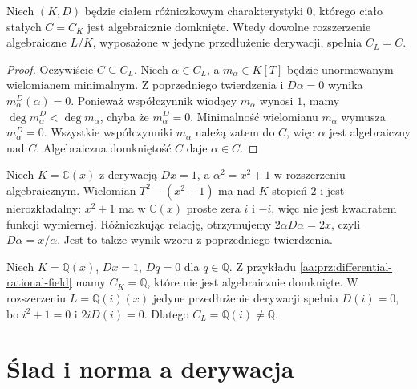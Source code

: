 \begin{wniosek}
\label{aa:cor:algebraic-constants}
Niech $(K,D)$ będzie ciałem różniczkowym
charakterystyki $0$, którego ciało stałych $C=C_K$
jest algebraicznie domknięte. Wtedy dowolne
rozszerzenie algebraiczne $L/K$, wyposażone
w jedyne przedłużenie derywacji, spełnia $C_L=C$.
\end{wniosek}
\begin{proof}
Oczywiście $C\subseteq C_L$. Niech $\alpha\in C_L$,
a $m_\alpha\in K[T]$ będzie unormowanym
wielomianem minimalnym. Z poprzedniego twierdzenia
i $D\alpha=0$ wynika $m_\alpha^D(\alpha)=0$.
Ponieważ współczynnik wiodący $m_\alpha$ wynosi $1$,
mamy $\deg m_\alpha^D<\deg m_\alpha$,
chyba że $m_\alpha^D=0$. Minimalność wielomianu
$m_\alpha$ wymusza $m_\alpha^D=0$.
Wszystkie współczynniki $m_\alpha$ należą zatem do $C$,
więc $\alpha$ jest algebraiczny nad $C$.
Algebraiczna domkniętość $C$ daje $\alpha\in C$.
\end{proof}

\begin{przyklad}
\label{aa:prz:derivative-algebraic-sqrt}
Niech $K=\mathbb C(x)$ z derywacją $Dx=1$, a
$\alpha^2=x^2+1$ w rozszerzeniu algebraicznym.
Wielomian $T^2-(x^2+1)$ ma nad $K$ stopień $2$
i jest nierozkładalny: $x^2+1$ ma w $\mathbb C(x)$
proste zera $i$ i $-i$, więc nie jest kwadratem
funkcji wymiernej. Różniczkując relację, otrzymujemy
$2\alpha D\alpha=2x$, czyli
$D\alpha=x/\alpha$. Jest to także wynik wzoru
z poprzedniego twierdzenia.
\end{przyklad}

\begin{przyklad}
\label{aa:prz:algebraic-new-constants}
Niech $K=\mathbb Q(x)$, $Dx=1$, $Dq=0$
dla $q\in\mathbb Q$. Z przykładu
\ref{aa:prz:differential-rational-field} mamy
$C_K=\mathbb Q$, które nie jest algebraicznie
domknięte. W rozszerzeniu
$L=\mathbb Q(i)(x)$ jedyne przedłużenie
derywacji spełnia $D(i)=0$, bo
$i^2+1=0$ i $2iD(i)=0$. Dlatego
$C_L=\mathbb Q(i)\ne\mathbb Q$.
\end{przyklad}

\section{Ślad i norma a derywacja}

